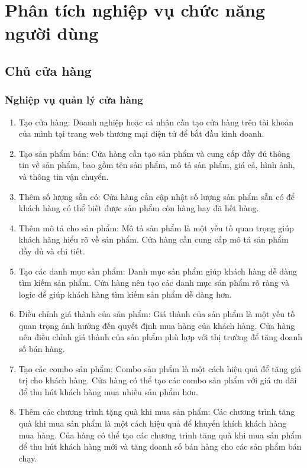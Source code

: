 \section{Phân tích nghiệp vụ chức năng người dùng}
    \subsection{Chủ cửa hàng}
        \subsubsection{Nghiệp vụ quản lý cửa hàng}
        \begin{enumerate}
            \item Tạo cửa hàng: Doanh nghiệp hoặc cá nhân cần tạo cửa hàng trên tài khoản của mình tại trang web thương mại điện tử để bắt đầu kinh doanh.
            \item Tạo sản phẩm bán: Cửa hàng cần tạo sản phẩm và cung cấp đầy đủ thông tin về sản phẩm, bao gồm tên sản phẩm, mô tả sản phẩm, giá cả, hình ảnh, và thông tin vận chuyển.
            \item Thêm số lượng sẵn có: Cửa hàng cần cập nhật số lượng sản phẩm sẵn có để khách hàng có thể biết được sản phẩm còn hàng hay đã hết hàng.
            \item Thêm mô tả cho sản phẩm: Mô tả sản phẩm là một yếu tố quan trọng giúp khách hàng hiểu rõ về sản phẩm. Cửa hàng cần cung cấp mô tả sản phẩm đầy đủ và chi tiết.
            \item Tạo các danh mục sản phẩm: Danh mục sản phẩm giúp khách hàng dễ dàng tìm kiếm sản phẩm. Cửa hàng nên tạo các danh mục sản phẩm rõ ràng và logic để giúp khách hàng tìm kiếm sản phẩm dễ dàng hơn.
            \item Điều chỉnh giá thành của sản phẩm: Giá thành của sản phẩm là một yếu tố quan trọng ảnh hưởng đến quyết định mua hàng của khách hàng. Cửa hàng nên điều chỉnh giá thành của sản phẩm phù hợp với thị trường để tăng doanh số bán hàng.
            \item Tạo các combo sản phẩm: Combo sản phẩm là một cách hiệu quả để tăng giá trị cho khách hàng. Cửa hàng có thể tạo các combo sản phẩm với giá ưu đãi để thu hút khách hàng mua nhiều sản phẩm hơn.
            \item Thêm các chương trình tặng quà khi mua sản phẩm: Các chương trình tăng quà khi mua sản phẩm là một cách hiệu quả để khuyến khích khách hàng mua hàng. Của hàng có thể tạo các chương trình tăng quà khi mua sản phẩm để thu hút khách hàng mới và tăng doanh số bán hàng cho các sản phẩm bán chạy.
        \end{enumerate}
